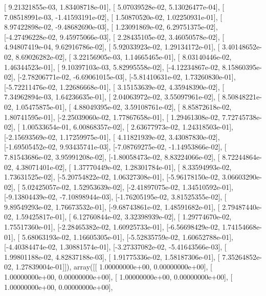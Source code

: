 \documentclass{article}
\begin{document}
       [ 9.21321855e-03,  1.83408718e-01],
       [ 5.07039528e-02,  5.13026477e-04],
       [ 7.08518991e-03, -1.41593191e-02],
       [ 1.50870520e-02,  1.02250931e-01],
       [ 8.97422898e-02, -9.48682690e-03],
       [ 1.23091869e-02,  6.29751375e-02],
       [-4.27496228e-02,  9.45975066e-03],
       [ 2.28435105e-02,  3.46050578e-02],
       [ 4.94807419e-04,  9.62916786e-02],
       [ 5.92033923e-02,  1.29134172e-01],
       [ 3.40148652e-02,  8.69026282e-02],
       [ 3.22156905e-03,  1.14665465e-01],
       [ 8.03140446e-02,  1.46344523e-01],
       [ 9.10397103e-03,  5.82995558e-02],
       [-4.12234867e-02,  8.15860395e-02],
       [-2.78206771e-02, -6.69061015e-03],
       [-5.81410631e-02,  1.73260830e-01],
       [-5.72211476e-02,  1.22686668e-01],
       [ 3.15153639e-02,  4.35948390e-02],
       [ 7.34962894e-03,  1.64236635e-01],
       [ 2.04063972e-02,  3.55097961e-02],
       [ 8.50848221e-02,  1.05475875e-01],
       [ 4.88049395e-02,  3.59108761e-02],
       [ 8.85872618e-02,  1.80741595e-01],
       [-2.25039060e-02,  1.77867658e-01],
       [ 1.29461308e-02,  7.72745738e-02],
       [ 1.00533654e-01,  6.00868357e-02],
       [ 2.63677973e-02,  1.24318503e-01],
       [-2.15693569e-02,  1.17259975e-01],
       [ 4.11821939e-02,  3.43087830e-02],
       [-1.69505452e-02,  9.93435741e-03],
       [-7.08769275e-02, -1.14953866e-02],
       [ 7.81543686e-02,  3.95991208e-02],
       [-1.80058473e-02,  8.83224066e-02],
       [ 8.72244864e-02,  4.38071401e-02],
       [ 1.37770449e-02,  1.28301784e-01],
       [ 8.33594993e-02,  1.73631525e-02],
       [-5.20754822e-02,  1.06327308e-01],
       [-5.96178150e-02,  3.06603290e-02],
       [ 5.02425057e-02,  1.52953639e-02],
       [-2.41897075e-02,  1.34510592e-01],
       [-9.13804439e-02, -7.10898944e-03],
       [-1.76205195e-02,  3.81525355e-02],
       [ 9.89549293e-02,  1.76673532e-01],
       [-9.68743861e-02,  1.48591682e-01],
       [ 2.79487440e-02,  1.59425817e-01],
       [ 6.12760844e-02,  3.32398939e-02],
       [ 1.29774670e-02,  1.75517360e-01],
       [-2.28465382e-02,  1.60925733e-01],
       [-6.56698429e-02,  1.74154668e-01],
       [ 5.68063193e-02,  1.16605305e-01],
       [-5.52835759e-02,  1.60652788e-01],
       [-4.40384474e-02,  1.30881574e-01],
       [-3.27337082e-02, -5.41643566e-03],
       [ 1.99801188e-02,  4.82837188e-03],
       [ 1.91775336e-02,  1.58187306e-01],
       [ 7.35264852e-02,  1.27839004e-01]]), array([[ 1.00000000e+00,  0.00000000e+00],
       [ 1.00000000e+00,  0.00000000e+00],
       [ 1.00000000e+00,  0.00000000e+00],
       [ 1.00000000e+00,  0.00000000e+00],
\end{document}
